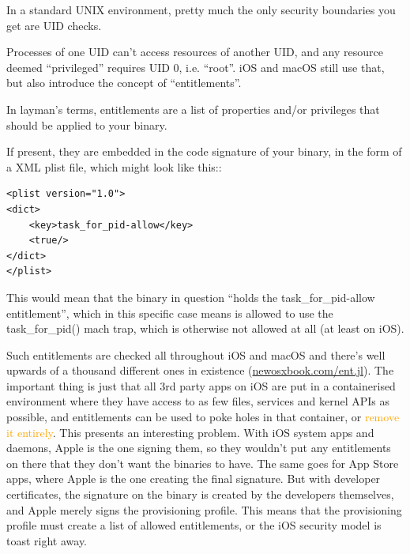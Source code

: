 \documentclass{beamer}
\begin{document}
\begin{frame}[fragile]
\begin{flushleft}
\small In a standard UNIX environment, pretty much the only security boundaries you get are UID checks.\vfill
\par Processes of one UID can’t access resources of another UID, and any resource deemed “privileged” requires UID 0, i.e. “root”. iOS and macOS still use that, but also introduce the concept of “entitlements”.\vfill
\par In layman’s terms, entitlements are a list of properties and/or privileges that should be applied to your binary.\vfill
\par If present, they are embedded in the code signature of your binary, in the form of a XML plist file, which might look like this::\vspace{2mm}
\begin{multicols*}{2}
\begin{verbatim}
<plist version="1.0">
<dict>
    <key>task_for_pid-allow</key>
    <true/>
</dict>
</plist>
\end{verbatim}
\footnotesize This would mean that the binary in question “holds the task\_for\_pid-allow entitlement”, which in this specific case means is allowed to use the task\_for\_pid() mach trap, which is otherwise not allowed at all (at least on iOS).
\end{multicols*}
\end{flushleft}
\end{frame}


\begin{frame}[fragile]
\begin{flushleft}\small
Such entitlements are checked all throughout iOS and macOS and there’s well upwards of a thousand different ones in existence {\footnotesize(\href{http://newosxbook.com/ent.jl}{newosxbook.com/ent.jl})}.
\vfill
The important thing is just that all 3rd party apps on iOS are put in a containerised environment where they have access to as few files, services and kernel APIs as possible, and entitlements can be used to poke holes in that container, or \textcolor{orange}{remove it entirely}.
\vfill
This presents an interesting problem. With iOS system apps and daemons, Apple is the one signing them, so they wouldn’t put any entitlements on there that they don’t want the binaries to have.
The same goes for App Store apps, where Apple is the one creating the final signature.
\vfill
But with developer certificates, the signature on the binary is created by the developers themselves, and Apple merely signs the provisioning profile. This means that the provisioning profile must create a list of allowed entitlements, or the iOS security model is toast right away.
\end{flushleft}
\end{frame}
\end{document}
